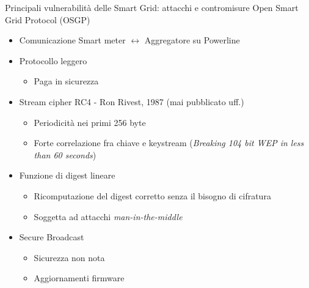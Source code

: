 \begin{frame}{Principali vulnerabilità delle Smart Grid: attacchi e contromisure}
Open Smart Grid Protocol (OSGP)
	\begin{itemize}[<+- | alert@+>]
		\item Comunicazione Smart meter $\leftrightarrow$ Aggregatore su Powerline
		\item Protocollo leggero
		\begin{itemize}
			\item Paga in sicurezza
		\end{itemize}
		\item Stream cipher RC4 - Ron Rivest, 1987 (mai pubblicato uff.)
		\begin{itemize}
			\item Periodicità nei primi 256 byte
			\item Forte correlazione fra chiave e keystream (\textit{Breaking 104 bit WEP in less than 60 seconds})
		\end{itemize}
		\item Funzione di digest lineare
		\begin{itemize}
			\item Ricomputazione del digest corretto senza il bisogno di cifratura
			\item Soggetta ad attacchi \textit{man-in-the-middle}
		\end{itemize}
		\item Secure Broadcast
		\begin{itemize}
			\item Sicurezza non nota
			\item Aggiornamenti firmware
		\end{itemize}
	\end{itemize}
\end{frame}